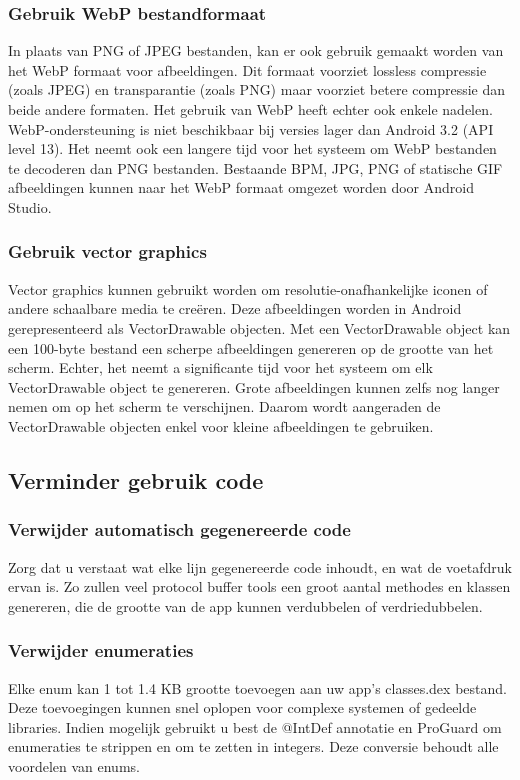 \subsubsection{Gebruik WebP bestandformaat }
\label{sec:webp}
In plaats van PNG of JPEG bestanden, kan er ook gebruik gemaakt worden van het WebP formaat voor afbeeldingen. Dit formaat voorziet lossless compressie (zoals JPEG) en transparantie (zoals PNG) maar voorziet betere compressie dan beide andere formaten. Het gebruik van WebP heeft echter ook enkele nadelen. WebP-ondersteuning is niet beschikbaar bij versies lager dan Android 3.2 (API level 13). Het neemt ook een langere tijd voor het systeem om WebP bestanden te decoderen dan PNG bestanden. Bestaande BPM, JPG, PNG of statische GIF afbeeldingen kunnen naar het WebP formaat omgezet worden door Android Studio. 

\subsubsection{Gebruik vector graphics }
\label{sec:vectorgraphics}
Vector graphics kunnen gebruikt worden om resolutie-onafhankelijke iconen of andere schaalbare media te creëren. Deze afbeeldingen worden in Android gerepresenteerd als VectorDrawable objecten. Met een VectorDrawable object kan een 100-byte bestand een scherpe afbeeldingen genereren op de grootte van het scherm. 
Echter, het neemt a significante tijd voor het systeem om elk VectorDrawable object te genereren. Grote afbeeldingen kunnen zelfs nog langer nemen om op het scherm te verschijnen. Daarom wordt aangeraden de VectorDrawable objecten enkel voor kleine afbeeldingen te gebruiken. 
\subsection{Verminder gebruik code}
\label{sec:reducecode}

\subsubsection{Verwijder automatisch gegenereerde code}
\label{sec:reducegeneratedcode}
Zorg dat u verstaat wat elke lijn gegenereerde code inhoudt, en wat de voetafdruk ervan is. Zo zullen veel protocol buffer tools een groot aantal methodes en klassen genereren, die de grootte van de app kunnen verdubbelen of verdriedubbelen.

\subsubsection*{Verwijder enumeraties}
\label{sec:removeenumerations}
Elke enum kan 1 tot 1.4 KB grootte toevoegen aan uw app's classes.dex bestand. Deze toevoegingen kunnen snel oplopen voor complexe systemen of gedeelde libraries. Indien mogelijk gebruikt u best de @IntDef annotatie en ProGuard om enumeraties te strippen en om te zetten in integers. Deze conversie behoudt alle voordelen van enums. 
